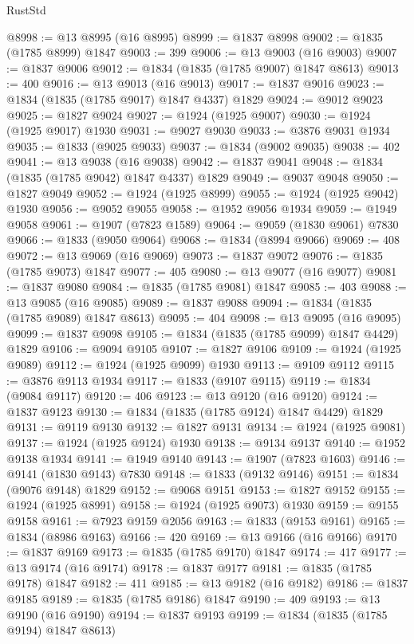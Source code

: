 \begin{lexlean}{RustStd}
\begin{coremodule}
@8998 := @13 @8995 (@16 @8995)
@8999 := @1837 @8998
@9002 := @1835 (@1785 @8999) @1847
@9003 := 399
@9006 := @13 @9003 (@16 @9003)
@9007 := @1837 @9006
@9012 := @1834 (@1835 (@1785 @9007) @1847 @8613)
@9013 := 400
@9016 := @13 @9013 (@16 @9013)
@9017 := @1837 @9016
@9023 := @1834 (@1835 (@1785 @9017) @1847 @4337) @1829
@9024 := @9012 @9023
@9025 := @1827 @9024
@9027 := @1924 (@1925 @9007)
@9030 := @1924 (@1925 @9017) @1930
@9031 := @9027 @9030
@9033 := @3876 @9031 @1934
@9035 := @1833 (@9025 @9033)
@9037 := @1834 (@9002 @9035)
@9038 := 402
@9041 := @13 @9038 (@16 @9038)
@9042 := @1837 @9041
@9048 := @1834 (@1835 (@1785 @9042) @1847 @4337) @1829
@9049 := @9037 @9048
@9050 := @1827 @9049
@9052 := @1924 (@1925 @8999)
@9055 := @1924 (@1925 @9042) @1930
@9056 := @9052 @9055
@9058 := @1952 @9056 @1934
@9059 := @1949 @9058
@9061 := @1907 (@7823 @1589)
@9064 := @9059 (@1830 @9061) @7830
@9066 := @1833 (@9050 @9064)
@9068 := @1834 (@8994 @9066)
@9069 := 408
@9072 := @13 @9069 (@16 @9069)
@9073 := @1837 @9072
@9076 := @1835 (@1785 @9073) @1847
@9077 := 405
@9080 := @13 @9077 (@16 @9077)
@9081 := @1837 @9080
@9084 := @1835 (@1785 @9081) @1847
@9085 := 403
@9088 := @13 @9085 (@16 @9085)
@9089 := @1837 @9088
@9094 := @1834 (@1835 (@1785 @9089) @1847 @8613)
@9095 := 404
@9098 := @13 @9095 (@16 @9095)
@9099 := @1837 @9098
@9105 := @1834 (@1835 (@1785 @9099) @1847 @4429) @1829
@9106 := @9094 @9105
@9107 := @1827 @9106
@9109 := @1924 (@1925 @9089)
@9112 := @1924 (@1925 @9099) @1930
@9113 := @9109 @9112
@9115 := @3876 @9113 @1934
@9117 := @1833 (@9107 @9115)
@9119 := @1834 (@9084 @9117)
@9120 := 406
@9123 := @13 @9120 (@16 @9120)
@9124 := @1837 @9123
@9130 := @1834 (@1835 (@1785 @9124) @1847 @4429) @1829
@9131 := @9119 @9130
@9132 := @1827 @9131
@9134 := @1924 (@1925 @9081)
@9137 := @1924 (@1925 @9124) @1930
@9138 := @9134 @9137
@9140 := @1952 @9138 @1934
@9141 := @1949 @9140
@9143 := @1907 (@7823 @1603)
@9146 := @9141 (@1830 @9143) @7830
@9148 := @1833 (@9132 @9146)
@9151 := @1834 (@9076 @9148) @1829
@9152 := @9068 @9151
@9153 := @1827 @9152
@9155 := @1924 (@1925 @8991)
@9158 := @1924 (@1925 @9073) @1930
@9159 := @9155 @9158
@9161 := @7923 @9159 @2056
@9163 := @1833 (@9153 @9161)
@9165 := @1834 (@8986 @9163)
@9166 := 420
@9169 := @13 @9166 (@16 @9166)
@9170 := @1837 @9169
@9173 := @1835 (@1785 @9170) @1847
@9174 := 417
@9177 := @13 @9174 (@16 @9174)
@9178 := @1837 @9177
@9181 := @1835 (@1785 @9178) @1847
@9182 := 411
@9185 := @13 @9182 (@16 @9182)
@9186 := @1837 @9185
@9189 := @1835 (@1785 @9186) @1847
@9190 := 409
@9193 := @13 @9190 (@16 @9190)
@9194 := @1837 @9193
@9199 := @1834 (@1835 (@1785 @9194) @1847 @8613)

\end{coremodule}
\end{lexlean}
